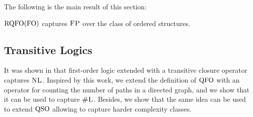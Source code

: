 The following is the main result of this section:
\begin{theorem} \label{rqfo-fo-cap}
	${\rm RQFO}({\rm FO})$ captures $\text{\sc FP}$ over the class of ordered structures.
\end{theorem}


%
%
%


\subsection{Transitive Logics}

It was shown in \cite{I86,I88} that first-order logic extended with a transitive closure operator captures $\text{\sc NL}$. Inspired by this work, we extend the definition of ${\rm QFO}$ with an operator for counting the number of paths in a directed graph, and we show that it can be used to capture $\text{\sc \#L}$. Besides, we show that the same idea can be used to extend ${\rm QSO}$ allowing to capture harder complexity classes. 

